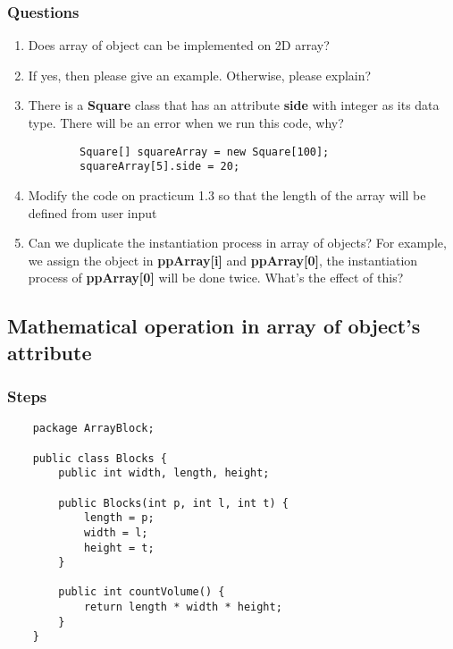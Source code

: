 \documentclass[12pt,titlepage]{article}
\begin{document}
\newpage

\subsubsection{Questions}

\begin{enumerate}
    \item Does array of object can be implemented on 2D array?
    \item If yes, then please give an example. Otherwise, please explain?
    \item There is a \textbf{Square} class that has an attribute \textbf{side} with integer as its data type. There will be an error when we run this code, why?
    \begin{verbatim}
        Square[] squareArray = new Square[100];
        squareArray[5].side = 20;
    \end{verbatim}
    \item Modify the code on practicum 1.3 so that the length of the array will be defined from user input
    \item Can we duplicate the instantiation process in array of objects? For example, we assign the object in \textbf{ppArray[i]} and \textbf{ppArray[0]}, the instantiation process of \textbf{ppArray[0]} will be done twice. What’s the effect of this?
\end{enumerate}

\newpage

\subsection{Mathematical operation in array of object’s attribute}

\subsubsection{Steps}

\begin{verbatim}
    package ArrayBlock;

    public class Blocks {
        public int width, length, height;

        public Blocks(int p, int l, int t) {
            length = p;
            width = l;
            height = t;
        }

        public int countVolume() {
            return length * width * height;
        }
    }
\end{verbatim}
\end{document}

